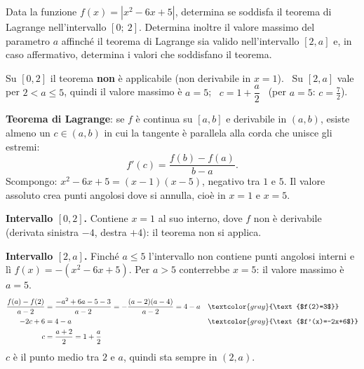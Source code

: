 
\begin{question}[ID=2.4, subtitle={Lagrange per $|x^2-6x+5|$ su $[0,2]$ e $[2,a]$}, tags={lagrange, teoremi, valore assoluto}, difficulty=difficile]
Data la funzione $f(x) = |x^2 - 6x + 5|$, determina se soddisfa il teorema di Lagrange nell'intervallo \([0;\ 2]\). Determina inoltre il valore massimo del parametro $a$ affinché il teorema di Lagrange sia valido nell'intervallo $[2, a]$ e, in caso affermativo, determina i valori che soddisfano il teorema.
\begin{solution}
Su $[0,2]$ il teorema \textbf{non} è applicabile (non derivabile in $x=1$). \ Su $[2,a]$ vale per $2<a\leq5$, quindi il valore massimo è $a=5$; \ $c=1+\dfrac a2$ \ (per $a=5$: $c=\tfrac72$).
\end{solution}
\begin{explanation}
\textbf{Teorema di Lagrange}: se $f$ è continua su $[a,b]$ e derivabile in $(a,b)$, esiste almeno un $c\in(a,b)$ in cui la tangente è parallela alla corda che unisce gli estremi:
\[ f'(c)=\dfrac{f(b)-f(a)}{b-a}. \]
Scompongo: $x^2-6x+5=(x-1)(x-5)$, negativo tra $1$ e $5$. Il valore assoluto crea punti angolosi dove si annulla, cioè in $x=1$ e $x=5$.

\textbf{Intervallo $[0,2]$.} Contiene $x=1$ al suo interno, dove $f$ non è derivabile (derivata sinistra $-4$, destra $+4$): il teorema non si applica.

\textbf{Intervallo $[2,a]$.} Finché $a\leq5$ l'intervallo non contiene punti angolosi interni e lì $f(x)=-(x^2-6x+5)$. Per $a>5$ conterrebbe $x=5$: il valore massimo è $a=5$.
\[\begin{aligned}
\dfrac{f(a)-f(2)}{a-2} &= \dfrac{-a^2+6a-5-3}{a-2}=-\dfrac{(a-2)(a-4)}{a-2}=4-a && \textcolor{gray}{\text{$f(2)=3$}}\\
-2c+6 &= 4-a && \textcolor{gray}{\text{$f'(x)=-2x+6$}}\\
c &= \dfrac{a+2}{2}=1+\dfrac a2
\end{aligned}\]
$c$ è il punto medio tra $2$ e $a$, quindi sta sempre in $(2,a)$.
\end{explanation}
\end{question}


